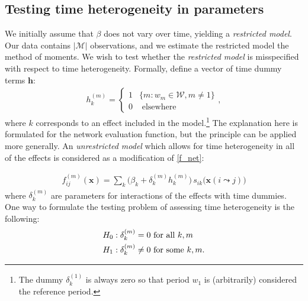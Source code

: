 \documentclass[a4paper,fleqn,11pt]{article}
\newcommand{\+}{\, + \,}
\begin{document}
\newpage
\subsection{Testing time heterogeneity in parameters}
\label{S_timetest2}

We initially assume that $\beta$ does not vary over time, yielding a
\emph{restricted model}. Our data contains $|\mathcal{M}|$ observations, and we
estimate the restricted model the method of moments. We wish to test whether the
\emph{restricted model} is misspecified with respect to time
heterogeneity. Formally, define a vector of time dummy terms $\mathbf{h}$:
\begin{align}
h_k^{(m)}=\left\{
\begin{array}{ll}
1& \{m : w_m \in \mathcal{W}, m \neq 1\}\\
0& \mbox{~elsewhere~}
\end{array}
\right . ,
\end{align}
where $k$ corresponds to an effect included in the model.\footnote{The dummy
  $\delta_k^{(1)}$ is always zero so that period $w_1$ is (arbitrarily)
  considered the reference period.} The explanation here
is formulated for the network evaluation function,
but the principle can be applied more generally.
An \emph{unrestricted model} which allows
for time heterogeneity in all of the effects is considered as a modification of
\eqref{f_net}:

\begin{align}
f^{(m)}_{ij}(\mathbf{x})= \sum_k \Big(\beta_k + \delta_k^{(m)} h_k^{(m)}\Big)
           \, s_{ik}\big(\mathbf{x}(i \leadsto j)\big)
\label{eq:fmij2}
\end{align}
where $\delta_k^{(m)}$ are parameters for interactions of the effects
with time dummies. One way
to formulate the testing problem of assessing time heterogeneity is the
following:
\begin{align}
H_0:\delta_k^{(m)} = 0 & \mbox{~for all~} k,m \notag\\
H_1:\delta_k^{(m)} \neq 0 & \mbox{ for some } k,m .
\label{hyptest}
\end{align}
\end{document}
